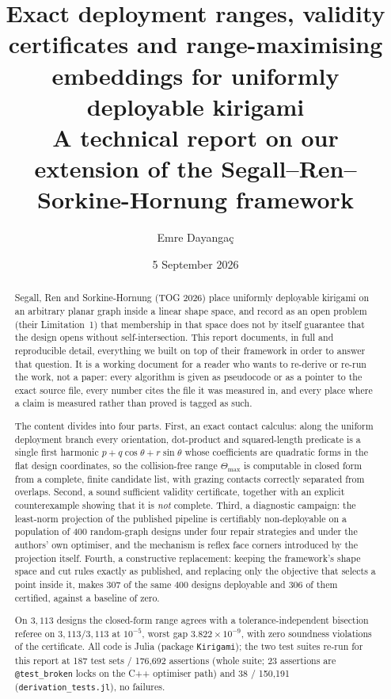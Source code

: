 \documentclass[11pt,a4paper]{article}
\title{\bf Exact deployment ranges, validity certificates and range-maximising\\
embeddings for uniformly deployable kirigami\\[6pt]
\large A technical report on our extension of the Segall--Ren--Sorkine-Hornung framework}
\author{Emre Dayangaç}
\date{5 September 2026}
\theoremstyle{definition}
\newcommand{\Tmax}{\Theta_{\max}}
\newcommand{\file}[1]{\texttt{\small #1}}
\begin{document}
\maketitle

\begin{abstract}
\noindent
Segall, Ren and Sorkine-Hornung (TOG 2026) place uniformly deployable kirigami on an
arbitrary planar graph inside a linear shape space, and record as an open problem
(their Limitation~1) that membership in that space does not by itself guarantee that the
design opens without self-intersection. This report documents, in full and reproducible
detail, everything we built on top of their framework in order to answer that question.
It is a working document for a reader who wants to re-derive or re-run the work, not a
paper: every algorithm is given as pseudocode or as a pointer to the exact source file,
every number cites the file it was measured in, and every place where a claim is
measured rather than proved is tagged as such.

The content divides into four parts. First, an exact contact calculus: along the uniform
deployment branch every orientation, dot-product and squared-length predicate is a single
first harmonic $p+q\cos\theta+r\sin\theta$ whose coefficients are quadratic forms in the
flat design coordinates, so the collision-free range $\Tmax$ is computable in closed form
from a complete, finite candidate list, with grazing contacts correctly separated from
overlaps. Second, a sound sufficient validity certificate, together with an explicit
counterexample showing that it is \emph{not} complete. Third, a diagnostic campaign:
the least-norm projection of the published pipeline is certifiably non-deployable on a
population of 400 random-graph designs under four repair strategies and under the authors'
own optimiser, and the mechanism is reflex face corners introduced by the projection
itself. Fourth, a constructive replacement: keeping the framework's shape space and cut
rules exactly as published, and replacing only the objective that selects a point inside
it, makes $307$ of the same $400$ designs deployable and $306$ of them certified, against
a baseline of zero.

On $3{,}113$ designs the closed-form range agrees with a tolerance-independent bisection
referee on $3{,}113/3{,}113$ at $10^{-5}$, worst gap $3.822\times10^{-9}$, with zero
soundness violations of the certificate. All code is Julia (package \file{Kirigami}); the two test
suites re-run for this report at 187 test sets / 176{,}692 assertions (whole suite; 23 assertions are \texttt{@test\_broken} locks on the C++ optimiser path) and 38 / 150{,}191 (\file{derivation\_tests.jl}), no failures.
\end{abstract}
\end{document}
